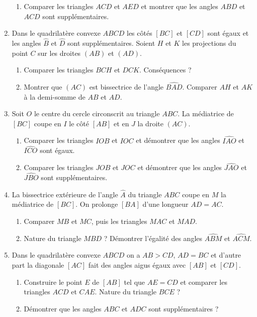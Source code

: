 \begin{enumerate}
\begin{enumerate}
\item Comparer les triangles $ACD$ et $AED$ et montrer que les angles $ABD$ et $ACD$
sont supplémentaires. 
\end{enumerate}
\item Dans le quadrilatère convexe $ABCD$ les côtés $[BC]$ et $[CD]$ sont égaux 
et les angles $\widehat{B}$ et $\widehat{D}$ sont supplémentaires. Soient $H$ et $K$
les projections du point $C$ sur les droites $(AB)$ et $(AD)$.
\begin{enumerate}
\item Comparer les triangles $BCH$ et $DCK$. Conséquences ?
\item Montrer que $(AC)$ est bissectrice de l'angle $\widehat{BAD}$. Comparer $AH$
et $AK$ à la demi-somme de $AB$ et $AD$.
\end{enumerate}
\item Soit $O$ le centre du cercle circonscrit au triangle $ABC$. La médiatrice 
de $[BC]$ coupe en $I$ le côté $[AB]$ et en $J$ la droite $(AC)$.\begin{enumerate}
\item Comparer les triangles $IOB$ et $IOC$ et démontrer que les angles
$\widehat{IAO}$ et $\widehat{ICO}$ sont égaux.
\item Comparer les triangles $JOB$ et $JOC$ et démontrer que les angles $\widehat{JAO}$ et $\widehat{JBO}$ sont supplémentaires.
\end{enumerate}
\item La bissectrice extérieure de l'angle $\widehat{A}$ du triangle $ABC$ coupe en $M$ la médiatrice de $[BC]$. On prolonge $[BA]$ d'une longueur $AD=AC$.\begin{enumerate}
\item Comparer $MB$ et $MC$, puis les triangles $MAC$ et $MAD$.
\item Nature du triangle $MBD$ ? Démontrer l'égalité des angles $\widehat{ABM}$ et 
$\widehat{ACM}$.
\end{enumerate}
\item Dans le quadrilatère convexe $ABCD$ on a $AB>CD$, $AD=BC$ et d'autre part la 
diagonale $[AC]$ fait des angles aigus égaux avec $[AB]$ et $[CD]$. 
\begin{enumerate}
\item Construire le point $E$ de $[AB]$ tel que $AE=CD$ et comparer les triangles $ACD$ et $CAE$. Nature du triangle $BCE$ ? 
\item Démontrer que les angles $ABC$ et $ADC$ sont supplémentaires ? 
\end{enumerate}

\end{enumerate}
